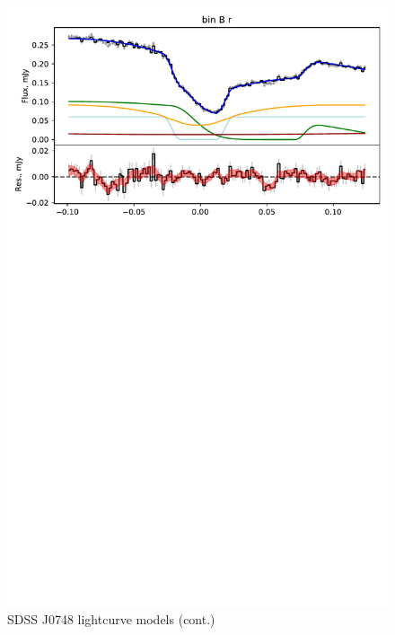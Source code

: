 \begin{figure}
    \centering
    \includegraphics[width=\textwidth]{figures/results/SDSS0748/SDSS0748_3.pdf}
    \caption{SDSS J0748 lightcurve models (cont.)}
    \label{fig:SDSS J0748 all lightcurves cont 2}
\end{figure}



